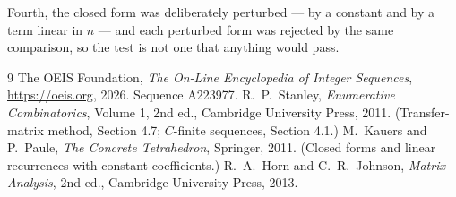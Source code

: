 \documentclass[11pt,a4paper]{article}
\theoremstyle{plain}
\theoremstyle{definition}
\begin{document}
Fourth, the closed form was deliberately perturbed --- by a constant and by a term linear in
$n$ --- and each perturbed form was rejected by the same comparison, so the test is not one
that anything would pass.

\begin{thebibliography}{9}
 The OEIS Foundation, \emph{The On-Line Encyclopedia of Integer
Sequences}, \url{https://oeis.org}, 2026. Sequence A223977.
 R.~P.~Stanley, \emph{Enumerative Combinatorics}, Volume 1, 2nd ed.,
Cambridge University Press, 2011. (Transfer-matrix method, Section 4.7; $C$-finite sequences,
Section 4.1.)
 M.~Kauers and P.~Paule, \emph{The Concrete Tetrahedron}, Springer, 2011.
(Closed forms and linear recurrences with constant coefficients.)
 R.~A.~Horn and C.~R.~Johnson, \emph{Matrix Analysis}, 2nd ed., Cambridge
University Press, 2013.
\end{thebibliography}
\end{document}
